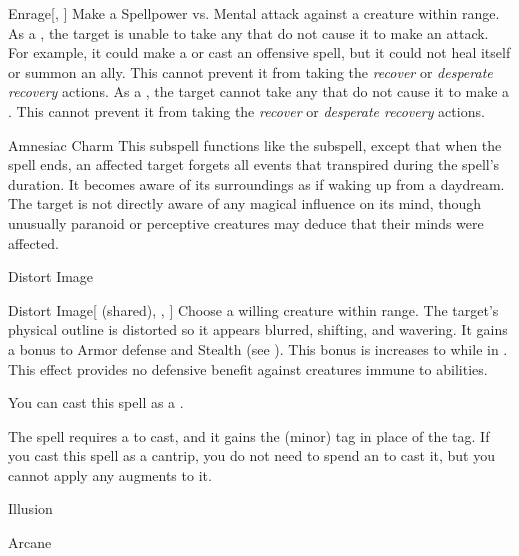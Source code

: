 \begin{ability}[\nth{4}]{Enrage}[, ]
Make a Spellpower vs. Mental attack against a creature within \rngmed range.
\hit As a , the target is unable to take any  that do not cause it to make an attack.
For example, it could make a  or cast an offensive spell, but it could not heal itself or summon an ally.
This cannot prevent it from taking the \textit{recover} or \textit{desperate recovery} actions.
\crit As a , the target cannot take any  that do not cause it to make a .
This cannot prevent it from taking the \textit{recover} or \textit{desperate recovery} actions.
\end{ability}
\vspace{0.25em}


\begin{ability}[\nth{7}]{Amnesiac Charm}
This subspell functions like the  subspell, except that when the spell ends, an affected target forgets all events that transpired during the spell's duration.
It becomes aware of its surroundings as if waking up from a daydream.
The target is not directly aware of any magical influence on its mind, though unusually paranoid or perceptive creatures may deduce that their minds were affected.
\end{ability}
\vspace{0.25em}

\newpage
\begin{spellsection}{Distort Image}


\begin{ability}{Distort Image}[ (shared), , ]
Choose a willing creature within \rngmed range.
The target's physical outline is distorted so it appears blurred, shifting, and wavering.
It gains a  bonus to Armor defense and Stealth (see ).
This bonus is increases to  while in .
This effect provides no defensive benefit against creatures immune to  abilities.

You can cast this spell as a .
\end{ability}



 The spell requires a  to cast, and it gains the  (minor) tag in place of the  tag. If you cast this spell as a cantrip,
you do not need to spend an  to cast it,
but you cannot apply any augments to it.


 Illusion

 Arcane
\end{spellsection}


